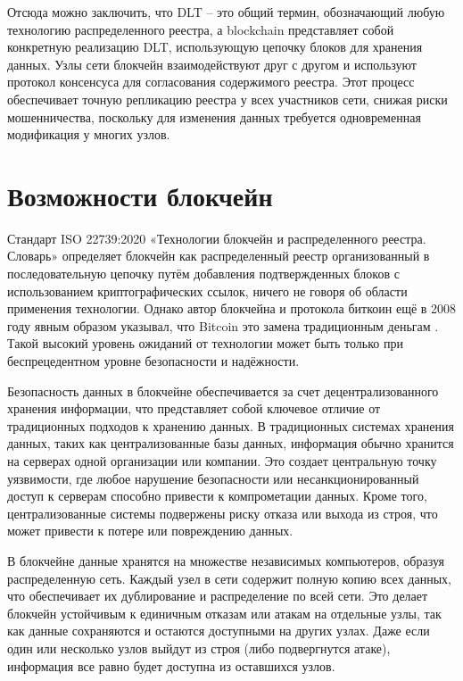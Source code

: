 Отсюда можно заключить, что DLT -- это общий термин, обозначающий любую технологию распределенного реестра, а blockchain представляет собой конкретную реализацию DLT, использующую цепочку блоков для хранения данных. Узлы сети блокчейн взаимодействуют друг с другом и используют протокол консенсуса для согласования содержимого реестра. Этот процесс обеспечивает точную репликацию реестра у всех участников сети, снижая риски мошенничества, поскольку для изменения данных требуется одновременная модификация у многих узлов.

\section{Возможности блокчейн}

Стандарт ISO 22739:2020 «Технологии блокчейн и распределенного реестра. Словарь» определяет блокчейн как распределенный реестр организованный в последовательную цепочку путём добавления подтвержденных блоков с использованием криптографических ссылок\cite{label3}, ничего не говоря об области применения технологии. Однако автор блокчейна и протокола биткоин ещё в 2008 году явным образом указывал, что Bitcoin это замена традиционным деньгам \cite{label2}. Такой высокий уровень ожиданий от технологии может быть только при беспрецедентном уровне безопасности и надёжности.

Безопасность данных в блокчейне обеспечивается за счет децентрализованного хранения информации, что представляет собой ключевое отличие от традиционных подходов к хранению данных. В традиционных системах хранения данных, таких как централизованные базы данных, информация обычно хранится на серверах одной организации или компании. Это создает центральную точку уязвимости, где любое нарушение безопасности или несанкционированный доступ к серверам способно привести к компрометации данных. Кроме того, централизованные системы подвержены риску отказа или выхода из строя, что может привести к потере или повреждению данных\cite{label8}.

В блокчейне данные хранятся на множестве независимых компьютеров, образуя распределенную сеть. Каждый узел в сети содержит полную копию всех данных, что обеспечивает их дублирование и распределение по всей сети. Это делает блокчейн устойчивым к единичным отказам или атакам на отдельные узлы, так как данные сохраняются и остаются доступными на других узлах. Даже если один или несколько узлов выйдут из строя (либо подвергнутся атаке), информация все равно будет доступна из оставшихся узлов.


